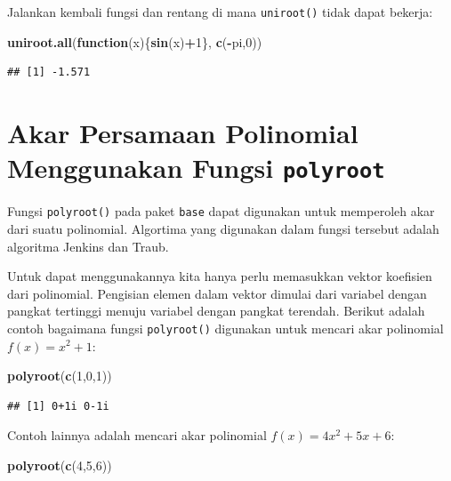 \documentclass[]{book}
\newenvironment{Shaded}{\begin{snugshade}}{\end{snugshade}}
\newcommand{\ControlFlowTok}[1]{\textcolor[rgb]{0.13,0.29,0.53}{\textbf{#1}}}
\newcommand{\DecValTok}[1]{\textcolor[rgb]{0.00,0.00,0.81}{#1}}
\newcommand{\KeywordTok}[1]{\textcolor[rgb]{0.13,0.29,0.53}{\textbf{#1}}}
\newcommand{\NormalTok}[1]{#1}
\newcommand{\OperatorTok}[1]{\textcolor[rgb]{0.81,0.36,0.00}{\textbf{#1}}}
\theoremstyle{definition}
\theoremstyle{definition}
\theoremstyle{definition}
\theoremstyle{remark}
\begin{document}
Jalankan kembali fungsi dan rentang di mana \texttt{uniroot()} tidak dapat bekerja:

\begin{Shaded}
\begin{Highlighting}[]
\KeywordTok{uniroot.all}\NormalTok{(}\ControlFlowTok{function}\NormalTok{(x)\{}\KeywordTok{sin}\NormalTok{(x)}\OperatorTok{+}\DecValTok{1}\NormalTok{\}, }\KeywordTok{c}\NormalTok{(}\OperatorTok{-}\NormalTok{pi,}\DecValTok{0}\NormalTok{))}
\end{Highlighting}
\end{Shaded}

\begin{verbatim}
## [1] -1.571
\end{verbatim}

\hypertarget{akar-persamaan-polinomial-menggunakan-fungsi-polyroot}{%
\section{\texorpdfstring{Akar Persamaan Polinomial Menggunakan Fungsi \texttt{polyroot}}{Akar Persamaan Polinomial Menggunakan Fungsi polyroot}}\label{akar-persamaan-polinomial-menggunakan-fungsi-polyroot}}

Fungsi \texttt{polyroot()} pada paket \texttt{base} dapat digunakan untuk memperoleh akar dari suatu polinomial. Algortima yang digunakan dalam fungsi tersebut adalah algoritma Jenkins dan Traub.

Untuk dapat menggunakannya kita hanya perlu memasukkan vektor koefisien dari polinomial. Pengisian elemen dalam vektor dimulai dari variabel dengan pangkat tertinggi menuju variabel dengan pangkat terendah. Berikut adalah contoh bagaimana fungsi \texttt{polyroot()} digunakan untuk mencari akar polinomial \(f\left(x\right)=x^2+1\):

\begin{Shaded}
\begin{Highlighting}[]
\KeywordTok{polyroot}\NormalTok{(}\KeywordTok{c}\NormalTok{(}\DecValTok{1}\NormalTok{,}\DecValTok{0}\NormalTok{,}\DecValTok{1}\NormalTok{))}
\end{Highlighting}
\end{Shaded}

\begin{verbatim}
## [1] 0+1i 0-1i
\end{verbatim}

Contoh lainnya adalah mencari akar polinomial \(f\left(x\right)=4x^2+5x+6\):

\begin{Shaded}
\begin{Highlighting}[]
\KeywordTok{polyroot}\NormalTok{(}\KeywordTok{c}\NormalTok{(}\DecValTok{4}\NormalTok{,}\DecValTok{5}\NormalTok{,}\DecValTok{6}\NormalTok{))}
\end{Highlighting}
\end{Shaded}
\end{document}
